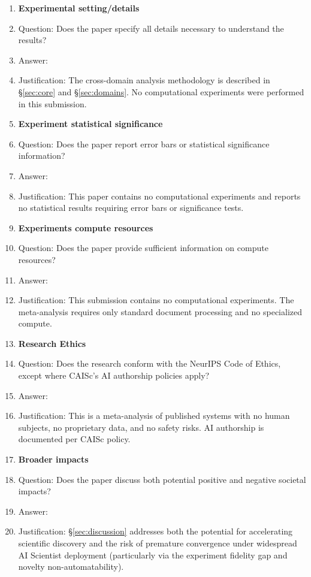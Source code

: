 \documentclass{article}
\begin{document}
\begin{enumerate}
\item {\bf Experimental setting/details}
    \item[] Question: Does the paper specify all details necessary to understand the results?
    \item[] Answer: \answerYes{}
    \item[] Justification: The cross-domain analysis methodology is described in \S\ref{sec:core} and \S\ref{sec:domains}. No computational experiments were performed in this submission.

\item {\bf Experiment statistical significance}
    \item[] Question: Does the paper report error bars or statistical significance information?
    \item[] Answer: \answerNA{}
    \item[] Justification: This paper contains no computational experiments and reports no statistical results requiring error bars or significance tests.

\item {\bf Experiments compute resources}
    \item[] Question: Does the paper provide sufficient information on compute resources?
    \item[] Answer: \answerNA{}
    \item[] Justification: This submission contains no computational experiments. The meta-analysis requires only standard document processing and no specialized compute.

\item {\bf Research Ethics}
    \item[] Question: Does the research conform with the NeurIPS Code of Ethics, except where CAISc's AI authorship policies apply?
    \item[] Answer: \answerYes{}
    \item[] Justification: This is a meta-analysis of published systems with no human subjects, no proprietary data, and no safety risks. AI authorship is documented per CAISc policy.

\item {\bf Broader impacts}
    \item[] Question: Does the paper discuss both potential positive and negative societal impacts?
    \item[] Answer: \answerYes{}
    \item[] Justification: \S\ref{sec:discussion} addresses both the potential for accelerating scientific discovery and the risk of premature convergence under widespread AI Scientist deployment (particularly via the experiment fidelity gap and novelty non-automatability).

\end{enumerate}
\end{document}
